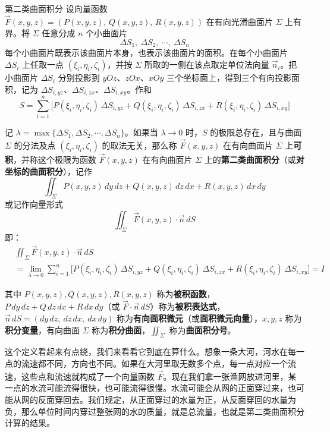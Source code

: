 \begin{definition}{第二类曲面积分}{}
    设向量函数 \(\vec{F}(x,y,z) = (P(x,y,z),\,Q(x,y,z),\,R(x,y,z))\) 在有向光滑曲面片 \(\Sigma\) 上有界。将 \(\Sigma\) 任意分成 \(n\) 个小曲面片
\[
\Delta S_1,\ \Delta S_2,\ \cdots,\ \Delta S_n
\]
每个小曲面片既表示该曲面片本身，也表示该曲面片的面积。在每个小曲面片 \(\Delta S_i\) 上任取一点 \((\xi_i,\eta_i,\zeta_i)\)，并按 \(\Sigma\) 所取的一侧在该点取定单位法向量 \(\vec{n}_i\)。把小曲面片 \(\Delta S_i\) 分别投影到 \(yOz\)、\(zOx\)、\(xOy\) 三个坐标面上，得到三个有向投影面积，记为 \(\Delta S_{i,yz}\)、\(\Delta S_{i,zx}\)、\(\Delta S_{i,xy}\)。作和
\[
S = \sum_{i=1}^{n} \bigl[ P(\xi_i,\eta_i,\zeta_i)\,\Delta S_{i,yz} + Q(\xi_i,\eta_i,\zeta_i)\,\Delta S_{i,zx} + R(\xi_i,\eta_i,\zeta_i)\,\Delta S_{i,xy} \bigr]
\]

记 \(\lambda = \max\{\Delta S_1,\Delta S_2,\cdots,\Delta S_n\}\)。如果当 \(\lambda \to 0\) 时，\(S\) 的极限总存在，且与曲面 \(\Sigma\) 的分法及点 \((\xi_i,\eta_i,\zeta_i)\) 的取法无关，那么称 \(\vec{F}(x,y,z)\) 在有向曲面片 \(\Sigma\) 上\textbf{可积}，并称这个极限为函数 \(\vec{F}(x,y,z)\) 在有向曲面片 \(\Sigma\) 上的\textbf{第二类曲面积分}（或\textbf{对坐标的曲面积分}），记作
\[
\iint_{\Sigma} P(x,y,z)\,dy\,dz + Q(x,y,z)\,dz\,dx + R(x,y,z)\,dx\,dy
\]
或记作向量形式
\[
\iint_{\Sigma} \vec{F}(x,y,z) \cdot \vec{n}\,dS
\]
即：
\[
\begin{aligned}
    &\iint_{\Sigma} \vec{F}(x,y,z) \cdot \vec{n}\,dS\\ 
    &= \lim_{\lambda \to 0} \sum_{i=1}^{n} \bigl[ P(\xi_i,\eta_i,\zeta_i)\,\Delta S_{i,yz} + Q(\xi_i,\eta_i,\zeta_i)\,\Delta S_{i,zx} + R(\xi_i,\eta_i,\zeta_i)\,\Delta S_{i,xy} \bigr] 
    = I
\end{aligned}
\]

其中 \(P(x,y,z), Q(x,y,z), R(x,y,z)\) 称为\textbf{被积函数}，\(P\,dy\,dz + Q\,dz\,dx + R\,dx\,dy\)（或 \(\vec{F} \cdot \vec{n}\,dS\)）称为\textbf{被积表达式}，\(\vec{n}\,dS = (dy\,dz,\ dz\,dx,\ dx\,dy)\) 称为\textbf{有向面积微元}（或\textbf{面积微元向量}），\(x,y,z\) 称为\textbf{积分变量}，有向曲面 \(\Sigma\) 称为\textbf{积分曲面}，\(\iint_{\Sigma}\) 称为\textbf{曲面积分号}。
\end{definition}

这个定义看起来有点绕，我们来看看它到底在算什么。想象一条大河，河水在每一点的流速都不同，方向也不同。如果在大河里取无数多个点，每一点对应一个流速，这些点和流速就构成了一个向量函数 \(\vec{F}\)。现在我们拿一张渔网放进河里，某一点的水流可能流得很快，也可能流得很慢。水流可能会从网的正面穿过来，也可能从网的反面穿回去。我们规定，从正面穿过的水量为正，从反面穿回的水量为负，那么单位时间内穿过整张网的水的质量，就是总流量，也就是第二类曲面积分计算的结果。

